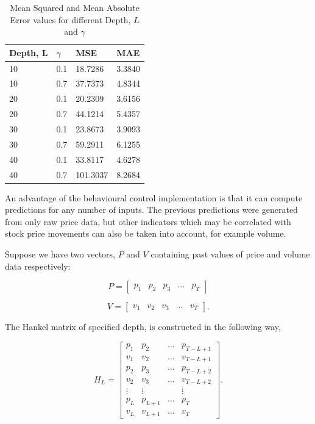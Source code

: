 \begin{table}[h!]
    \begin{center}
        \begin{tabular}{|l|l|l|l|}
        \hline
        Depth, L & $\gamma$ & MSE     & MAE    \\ \hline
        10       & 0.1                   & 18.7286 & 3.3840 \\ \hline
        10       & 0.7                   & 37.7373 & 4.8344 \\ \hline
        20       & 0.1                   & 20.2309 & 3.6156 \\ \hline
        20       & 0.7                   & 44.1214 & 5.4357 \\ \hline
        30       & 0.1                   & 23.8673 & 3.9093 \\ \hline
        30       & 0.7                   & 59.2911 & 6.1255 \\ \hline
        40       & 0.1                   & 33.8117 & 4.6278 \\ \hline
        40       & 0.7                   & 101.3037 & 8.2684 \\ \hline
        \end{tabular}
    \end{center}
    \caption{Mean Squared and Mean Absolute Error values for different Depth, $L$ and $\gamma$}
    \label{tab: behave_mse_simple}
\end{table}

\noindent An advantage of the behavioural control implementation is that it can compute predictions for any number of inputs. The previous predictions were generated from only raw price data, but other indicators which may be correlated with stock price movements can also be taken into account, for example volume. 

\noindent Suppose we have two vectors, $P$ and $V$ containing past values of price and volume data respectively: 

$$P = \begin{bmatrix}
p_1 & p_2 & p_3 & \hdots & p_T
\end{bmatrix} $$ 

$$V = \begin{bmatrix}  
v_1 & v_2 & v_3 & \hdots & v_T
\end{bmatrix}.$$ 

\noindent The Hankel matrix of specified depth, is constructed in the following way, 

$$ H_{L} = \begin{bmatrix}
p_1 & p_2 & \hdots & p_{T-L+1} \\
v_1 & v_2 & \hdots & v_{T-L+1} \\
p_2 & p_3 & \hdots & p_{T-L+2} \\
v_2 & v_3 & \hdots & v_{T-L+2} \\
\vdots & \vdots & & \vdots \\
p_L & p_{L+1} & \hdots & p_T \\
v_L & v_{L+1} & \hdots & v_T 
\end{bmatrix} .$$ \\

